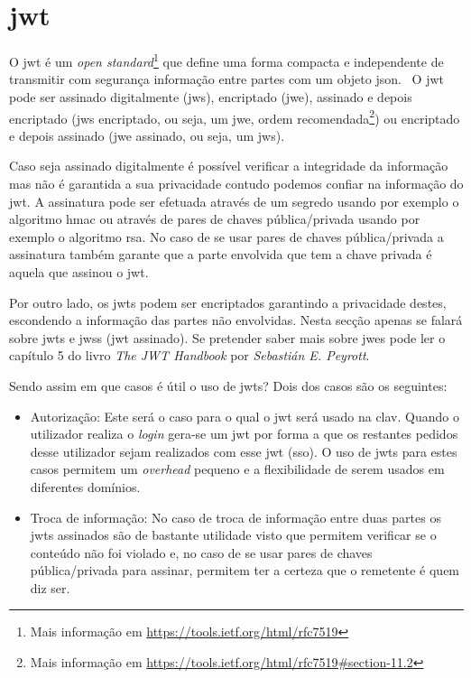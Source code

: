 \section{\acrfull{jwt}}
O \acrshort{jwt} é um \textit{open standard}\footnote{Mais informação em \url{https://tools.ietf.org/html/rfc7519}} que define uma forma compacta e independente de transmitir com segurança informação entre partes com um objeto \acrshort{json}.~\cite{jwtio} O \acrshort{jwt} pode ser assinado digitalmente (\acrshort{jws}), encriptado (\acrshort{jwe}), assinado e depois encriptado (\acrshort{jws} encriptado, ou seja, um \acrshort{jwe}, ordem recomendada\footnote{Mais informação em \url{https://tools.ietf.org/html/rfc7519\#section-11.2}}) ou encriptado e depois assinado (\acrshort{jwe} assinado, ou seja, um \acrshort{jws}).

Caso seja assinado digitalmente é possível verificar a integridade da informação mas não é garantida a sua privacidade contudo podemos confiar na informação do \acrshort{jwt}. A assinatura pode ser efetuada através de um segredo usando por exemplo o algoritmo \acrshort{hmac} ou através de pares de chaves pública/privada usando por exemplo o algoritmo \acrshort{rsa}. No caso de se usar pares de chaves pública/privada a assinatura também garante que a parte envolvida que tem a chave privada é aquela que assinou o \acrshort{jwt}.

Por outro lado, os \acrshort{jwt}s podem ser encriptados garantindo a privacidade destes, escondendo a informação das partes não envolvidas. Nesta secção apenas se falará sobre \acrshort{jwt}s e \acrshort{jws}s (\acrshort{jwt} assinado). Se pretender saber mais sobre \acrshort{jwe}s pode ler o capítulo 5 do livro \textit{The JWT Handbook} por \textit{Sebastián E. Peyrott}.

Sendo assim em que casos é útil o uso de \acrshort{jwt}s? Dois dos casos são os seguintes:
\begin{itemize}
    \item Autorização: Este será o caso para o qual o \acrshort{jwt} será usado na \acrshort{clav}. Quando o utilizador realiza o \textit{login} gera-se um \acrshort{jwt} por forma a que os restantes pedidos desse utilizador sejam realizados com esse \acrshort{jwt} (\acrlong{sso}). O uso de \acrshort{jwt}s para estes casos permitem um \textit{overhead} pequeno e a flexibilidade de serem usados em diferentes domínios.
    \item Troca de informação: No caso de troca de informação entre duas partes os \acrshort{jwt}s assinados são de bastante utilidade visto que permitem verificar se o conteúdo não foi violado e, no caso de se usar pares de chaves pública/privada para assinar, permitem ter a certeza que o remetente é quem diz ser.
\end{itemize}

